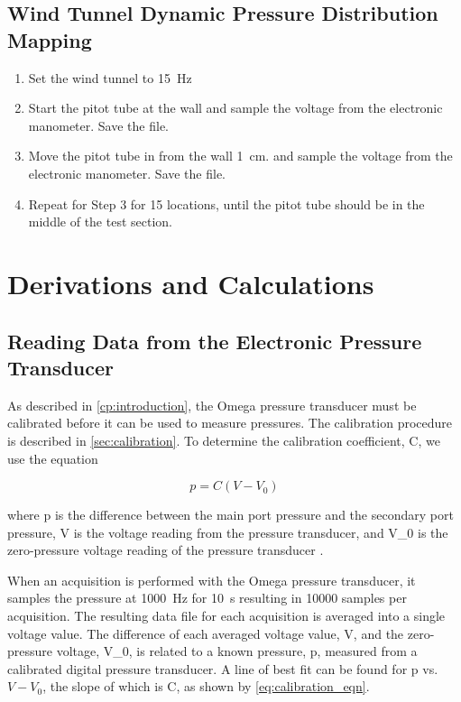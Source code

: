 \subsection{Wind Tunnel Dynamic Pressure Distribution Mapping}\label{subsec:dynamic_pressure_mapping}

\begin{enumerate}
    \item Set the wind tunnel to \qty{15}{\hertz}
    \item Start the pitot tube at the wall and sample the voltage from the electronic manometer. Save the file. 
    \item Move the pitot tube in from the wall \qty{1}{\centi\meter}. and sample the voltage from the electronic manometer. Save the file.  
    \item Repeat for Step 3 for \num{15} locations, until the pitot tube should be in the middle of the test section.
\end{enumerate}

\section{Derivations and Calculations}

\subsection{Reading Data from the Electronic Pressure Transducer}

As described in \autoref{cp:introduction}, the Omega pressure transducer must be calibrated before it can be used to measure pressures. The calibration procedure is described in \autoref{sec:calibration}. To determine the calibration coefficient, \gls{C}, we use the equation

\begin{equation}\label{eq:calibration_eqn}
    p = C(V - V_0)
\end{equation}

\noindent{}where \gls{p} is the difference between the main port pressure and the secondary port pressure, \gls{V} is the voltage reading from the pressure transducer, and \gls{V_0} is the zero-pressure voltage reading of the pressure transducer \citep{lab3-manual}.

When an acquisition is performed with the Omega pressure transducer, it samples the pressure at \qty{1000}{\hertz} for \qty{10}{\second} resulting in \num{10000} samples per acquisition. The resulting data file for each acquisition is averaged into a single voltage value. The difference of each averaged voltage value, \gls{V}, and the zero-pressure voltage, \gls{V_0}, is related to a known pressure, \gls{p}, measured from a calibrated digital pressure transducer. A line of best fit can be found for \gls{p} vs. $V - V_0$, the slope of which is \gls{C}, as shown by \autoref{eq:calibration_eqn}.

